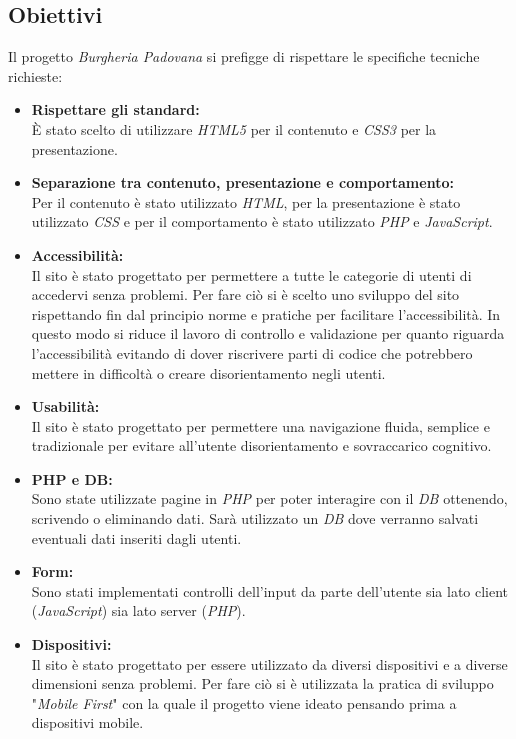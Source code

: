 \subsection{Obiettivi}
Il progetto \emph{Burgheria Padovana} si prefigge di rispettare le specifiche tecniche richieste:
\begin{itemize}
	\item \textbf{Rispettare gli standard:}\\ 
	È stato scelto di utilizzare \emph{HTML5} per il contenuto e \emph{CSS3} per la presentazione.
	\item \textbf{Separazione tra contenuto, presentazione e comportamento:}\\ 
	Per il contenuto è stato utilizzato \emph{HTML}, per la presentazione è stato utilizzato \emph{CSS} e per il comportamento è stato utilizzato \emph{PHP} e \emph{JavaScript}.
	\item \textbf{Accessibilità:}\\ 
	Il sito è stato progettato per permettere a tutte le categorie di utenti di accedervi senza problemi.
	Per fare ciò si è scelto uno sviluppo del sito rispettando fin dal principio norme e pratiche per facilitare l'accessibilità.
	In questo modo si riduce il lavoro di controllo e validazione per quanto riguarda l'accessibilità evitando di dover riscrivere parti di codice che potrebbero mettere in difficoltà o creare disorientamento negli utenti.
	\item \textbf{Usabilità:}\\
	Il sito è stato progettato per permettere una navigazione fluida, semplice e tradizionale per evitare all'utente disorientamento e sovraccarico cognitivo.
	\item \textbf{PHP e DB:}\\
	Sono state utilizzate pagine in \emph{PHP} per poter interagire con il \emph{DB} ottenendo, scrivendo o eliminando dati. Sarà utilizzato un \emph{DB} dove verranno salvati eventuali dati inseriti dagli utenti.
	\item \textbf{Form:}\\
	Sono stati implementati controlli dell'input da parte dell'utente sia lato client (\emph{JavaScript}) sia lato server (\emph{PHP}).
	\item \textbf{Dispositivi:}\\
	Il sito è stato progettato per essere utilizzato da diversi dispositivi e a diverse dimensioni senza problemi. Per fare ciò si è utilizzata la pratica di sviluppo "\emph{Mobile First}" con la quale il progetto viene ideato pensando prima a dispositivi mobile.
\end{itemize}
